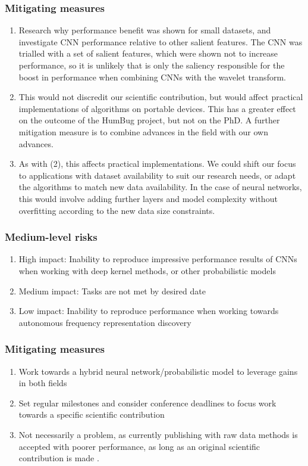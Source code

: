 \documentclass[12pt]{llncs}
\begin{document}
\subsubsection{Mitigating measures}
\begin{enumerate} 
    \item Research why performance benefit was shown for small datasets, and investigate CNN performance relative to other salient features. The CNN was trialled with a set of salient features, which were shown not to increase performance, so it is unlikely that is only the saliency responsible for the boost in performance when combining CNNs with the wavelet transform.
    \item This would not discredit our scientific contribution, but would affect practical implementations of algorithms on portable devices. This has a greater effect on the outcome of the HumBug project, but not on the PhD. A further mitigation measure is to combine advances in the field with our own advances.
	\item As with (2), this affects practical implementations. We could shift our focus to applications with dataset availability to suit our research needs, or adapt the algorithms to match new data availability. In the case of neural networks, this would involve adding further layers and model complexity without overfitting according to the new data size constraints.

\end{enumerate}

\subsubsection{Medium-level risks} 
\begin{enumerate}
	\item High impact: Inability to reproduce impressive performance results of CNNs when working with deep kernel methods, or other probabilistic models
    \item Medium impact: Tasks are not met by desired date
    \item Low impact: Inability to reproduce performance when working towards autonomous frequency representation discovery
\end{enumerate}
\subsubsection{Mitigating measures}
\begin{enumerate}
	\item Work towards a hybrid neural network/probabilistic model to leverage gains in both fields
    \item Set regular milestones and consider conference deadlines to focus work towards a specific scientific contribution
    \item Not necessarily a problem, as currently publishing with raw data methods is accepted with poorer performance, as long as an original scientific contribution is made \cite{dieleman2014end}.
\end{enumerate}
\end{document}
